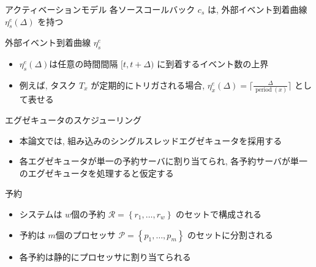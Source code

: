 \begin{frame}{アクティベーションモデル}
    各ソースコールバック $c_{s}$ は, 外部イベント到着曲線 $\eta_{s}^{e}(\Delta)$ を持つ
    \begin{block}{外部イベント到着曲線 $\eta_{s}^{e}$}
        \setlength{\linewidth}{0.98\columnwidth}
        \begin{itemize}
        \item $\eta_{s}^{e}(\Delta)$は任意の時間間隔 $[t, t+\Delta)$ に到着するイベント数の上界
        \item 例えば, タスク $T_{x}$ が定期的にトリガされる場合, $\eta_{x}^{e}(\Delta)=\lceil\frac{\Delta}{\operatorname{period}(x)}\rceil$ として表せる
        \end{itemize}
    \end{block}
\end{frame}

\begin{frame}{エグゼキュータのスケジューリング}
    \begin{itemize}
        \item 本論文では, 組み込みのシングルスレッドエグゼキュータを採用する
        \item 各エグゼキュータが単一の予約サーバに割り当てられ, 各予約サーバが単一のエグゼキュータを処理すると仮定する
    \end{itemize}
\end{frame}

\begin{frame}{予約}
    \begin{itemize}
        \item システムは $w$個の予約 $\mathcal{R}=\left\{r_{1}, \ldots, r_{w}\right\}$ のセットで構成される
        \item 予約は $m$個のプロセッサ $\mathcal{P}=\left\{p_{1}, \ldots, p_{m}\right\}$ のセットに分割される
        \item 各予約は静的にプロセッサに割り当てられる
    \end{itemize}
\end{frame}

